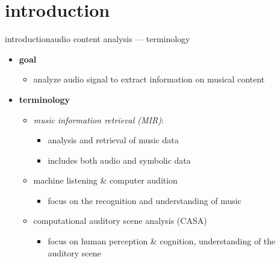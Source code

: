     \section[intro]{introduction}
        \begin{frame}{introduction}{audio content analysis --- terminology}
            \begin{itemize}
                \item   \textbf{goal}
                    \begin{itemize}
                        \item   analyze audio signal to extract information on musical content
                    \end{itemize}
                \bigskip
                \item<2->   \textbf{terminology}
                    \begin{itemize}
                        \item	\textit{music information retrieval (MIR)}:
                            \begin{itemize}
                                \item   analysis and retrieval of music data 
                                \item   includes both audio and symbolic data
                            \end{itemize}
                                
                        \smallskip
                        \item	machine listening \& computer audition
                            \begin{itemize}
                                \item   focus on the recognition and understanding of music
                            \end{itemize}
                            
                        \smallskip
                        \item	computational auditory scene analysis (CASA)
                            \begin{itemize}
                                \item   focus on human perception \& cognition, understanding of the auditory scene
                            \end{itemize}
                    \end{itemize}
           \end{itemize}
        \end{frame}
